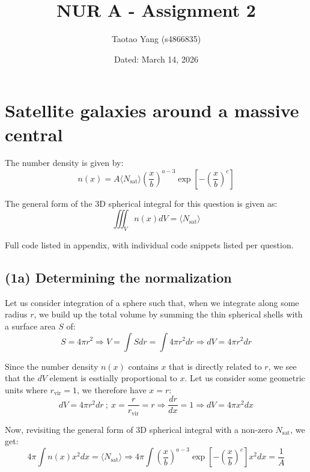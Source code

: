 \documentclass{article}
\title{NUR A - Assignment 2}
\author{Taotao Yang (s4866835)}
\date{Dated: March 14, 2026} %
\begin{document}
\maketitle
\section{Satellite galaxies around a massive central}

  The number density is given by:
  \begin{equation}
    n(x) 
    = A \langle N_\text{sat} \rangle 
    \left(\frac{x}{b}\right)^{a-3} 
    \exp{\left[-\left(\frac{x}{b}\right)^c\right]}
  \end{equation}

  The general form of the 3D spherical integral for this question is given as:
  \begin{equation}
    \iiint_V n(x) dV = \langle N_\text{sat} \rangle
  \end{equation}

  Full code listed in appendix, with individual code snippets listed per question.

  \subsection{(1a) Determining the normalization}
    Let us consider integration of a sphere such that, when we integrate along some 
    radius $r$, we build up the total volume by summing the thin spherical shells with
    a surface area $S$ of:
    \begin{equation}
      S = 4 \pi r^2 
      \Rightarrow V = \int S dr = \int 4 \pi r^2 dr 
      \Rightarrow dV = 4 \pi r^2 dr 
    \end{equation}

    Since the number density $n(x)$ contains $x$ that is directly related to $r$, we see
    that the $dV$ element is esstially proportional to $x$. Let us consider some 
    geometric units where $r_\text{vir} = 1$, we therefore have $x=r$:
    \begin{equation}
      dV = 4 \pi r^2 dr ~;~ x=\frac{r}{r_\text{vir}}=r
      \Rightarrow \frac{dr}{dx} = 1
      \Rightarrow dV = 4 \pi x^2 dx
    \end{equation}

    Now, revisiting the general form of 3D spherical integral with a non-zero 
    $N_\text{sat}$, we get:
    \begin{equation}
      4 \pi \int n(x) x^2 dx = \langle N_\text{sat} \rangle
      \Rightarrow 
      4 \pi \int \left(\frac{x}{b}\right)^{a-3} 
      \exp{\left[-\left(\frac{x}{b}\right)^c\right]} x^2 dx 
      = \frac{1}{A}
    \end{equation}
\end{document}
